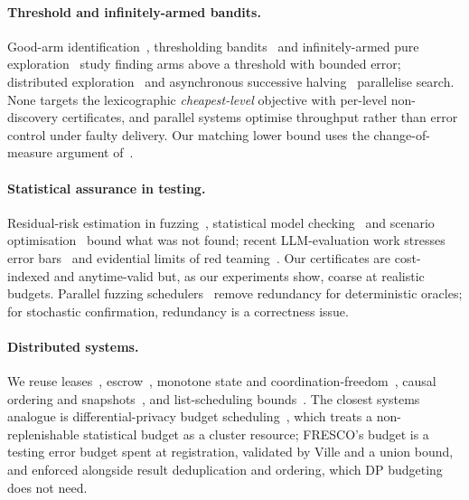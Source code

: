 \documentclass[11pt]{article}
\theoremstyle{definition}
\theoremstyle{remark}
\begin{document}
\paragraph{Threshold and infinitely-armed bandits.} Good-arm identification~\cite{kano2019}, thresholding bandits~\cite{locatelli2016} and infinitely-armed pure exploration~\cite{aziz2018,chaudhuri2017} study finding arms above a threshold with bounded error; distributed exploration~\cite{hillel2013} and asynchronous successive halving~\cite{li2020asha} parallelise search. None targets the lexicographic \emph{cheapest-level} objective with per-level non-discovery certificates, and parallel systems optimise throughput rather than error control under faulty delivery. Our matching lower bound uses the change-of-measure argument of~\cite{kaufmann2016}.

\paragraph{Statistical assurance in testing.} Residual-risk estimation in fuzzing~\cite{bohme2018stads,bohme2021residual}, statistical model checking~\cite{younes2006,legay2010} and scenario optimisation~\cite{campi2008} bound what was not found; recent LLM-evaluation work stresses error bars~\cite{miller2024errorbars} and evidential limits of red teaming~\cite{kaur2026ceiling}. Our certificates are cost-indexed and anytime-valid but, as our experiments show, coarse at realistic budgets. Parallel fuzzing schedulers~\cite{dynamiq2025} remove redundancy for deterministic oracles; for stochastic confirmation, redundancy is a correctness issue.

\paragraph{Distributed systems.} We reuse leases~\cite{gray1989leases}, escrow~\cite{oneil1986escrow}, monotone state and coordination-freedom~\cite{shapiro2011crdt,hellerstein2020calm}, causal ordering and snapshots~\cite{lamport1978,chandy1985}, and list-scheduling bounds~\cite{graham1969}. The closest systems analogue is differential-privacy budget scheduling~\cite{luo2021privatekube}, which treats a non-replenishable statistical budget as a cluster resource; FRESCO's budget is a testing error budget spent at registration, validated by Ville and a union bound, and enforced alongside result deduplication and ordering, which DP budgeting does not need.
\end{document}
